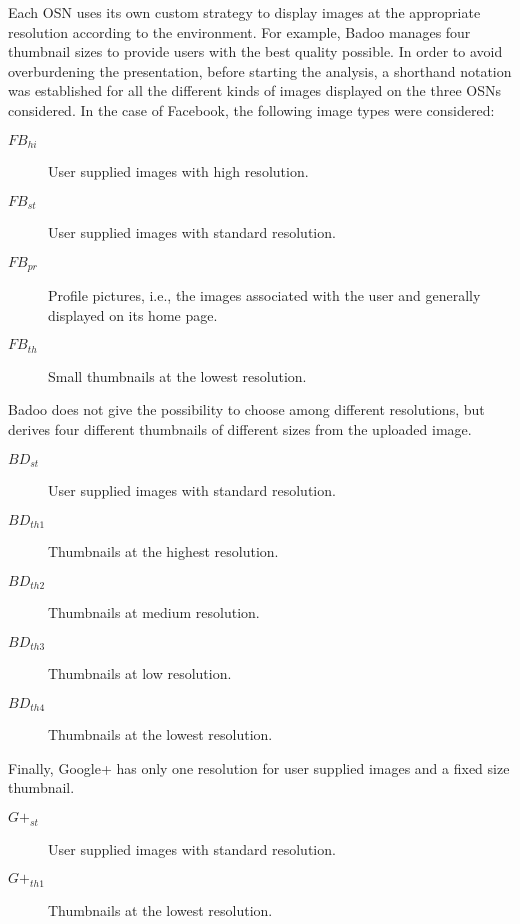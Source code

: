 \documentclass[10pt, conference]{IEEEtran}
\begin{document}
Each OSN uses its own custom strategy to display images at the appropriate resolution according to the environment. For example, Badoo manages four thumbnail sizes to provide users with the best quality possible.
In order to avoid overburdening the presentation, before starting the analysis, a shorthand notation was established for all the different kinds of images displayed on the three OSNs considered.
In the case of Facebook, the following image types were considered:

\begin{description}
\item [$FB_{hi}$] User supplied images with high resolution.
\item [$FB_{st}$] User supplied images with standard resolution.
\item [$FB_{pr}$] Profile pictures, i.e., the images associated with the user and generally displayed on its home page.
\item [$FB_{th}$] Small thumbnails at the lowest resolution.
\end{description}

Badoo does not give the possibility to choose among different resolutions, but derives four different thumbnails of different sizes from the uploaded image.

\begin{description}
\item [$BD_{st}$] User supplied images with standard resolution.
\item [$BD_{th1}$] Thumbnails at the highest resolution.
\item [$BD_{th2}$] Thumbnails at medium resolution.
\item [$BD_{th3}$] Thumbnails at low resolution.
\item [$BD_{th4}$] Thumbnails at the lowest resolution.
\end{description}

Finally, Google+ has only one resolution for user supplied images and a fixed size thumbnail. 
\begin{description}
\item [$G+_{st}$] User supplied images with standard resolution. 
\item [$G+_{th1}$] Thumbnails at the lowest resolution.
\end{description}
\end{document}

